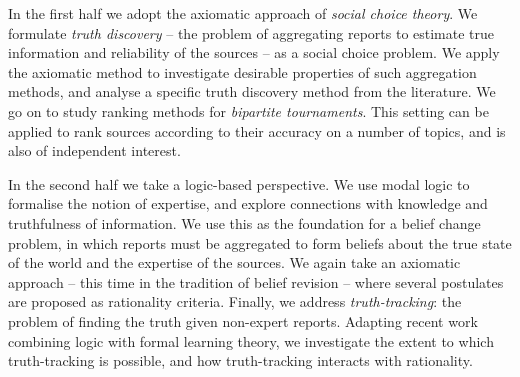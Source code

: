 In the first half we adopt the axiomatic approach of \emph{social choice
theory}. We formulate \emph{truth discovery} -- the problem of aggregating
reports to estimate true information and reliability of the sources -- as a
social choice problem. We apply the axiomatic method to investigate desirable
properties of such aggregation methods, and analyse a specific truth discovery
method from the literature.
%
We go on to study ranking methods for \emph{bipartite tournaments}. This
setting can be applied to rank sources according to their accuracy on a number
of topics, and is also of independent interest.

In the second half we take a logic-based perspective. We use modal logic to
formalise the notion of expertise, and explore connections with knowledge and
truthfulness of information. We use this as the foundation for a belief change
problem, in which reports must be aggregated to form beliefs about the true
state of the world and the expertise of the sources. We again take an axiomatic
approach -- this time in the tradition of belief revision -- where several
postulates are proposed as rationality criteria.
%
Finally, we address \emph{truth-tracking}: the problem of finding the truth
given non-expert reports. Adapting recent work combining logic with formal
learning theory, we investigate the extent to which truth-tracking is possible,
and how truth-tracking interacts with rationality.
